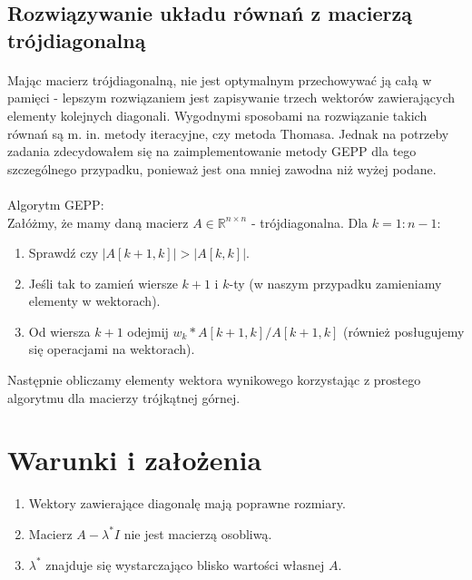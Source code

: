 \documentclass{article}
\begin{document}
\subsection{Rozwiązywanie układu równań z macierzą trójdiagonalną}
\label{tridiagonal}
\paragraph{}
Mając macierz trójdiagonalną, nie jest optymalnym przechowywać ją całą w pamięci - lepszym rozwiązaniem jest zapisywanie trzech wektorów zawierających elementy kolejnych diagonali. Wygodnymi sposobami na rozwiązanie takich równań są m. in. metody iteracyjne, czy metoda Thomasa. Jednak na potrzeby zadania zdecydowałem się na zaimplementowanie metody GEPP dla tego szczególnego przypadku, ponieważ jest ona mniej zawodna niż wyżej podane.
\paragraph{}
Algorytm GEPP:\\
Załóżmy, że mamy daną macierz $A\in\mathbb{R}^{n\times n}$ - trójdiagonalna. Dla $k=1:n-1$:
\begin{enumerate}
\item Sprawdź czy $|A[k+1,k]| > |A[k,k]|$.
\item Jeśli tak to zamień wiersze $k+1$ i $k$-ty (w naszym przypadku zamieniamy elementy w wektorach).
\item Od wiersza $k+1$ odejmij $w_{k}*A[k+1,k]/A[k+1,k]$ (również posługujemy się operacjami na wektorach).
\end{enumerate}
Następnie obliczamy elementy wektora wynikowego korzystając z prostego algorytmu dla macierzy trójkątnej górnej.
\section{Warunki i założenia}
\begin{enumerate}
\item Wektory zawierające diagonalę mają poprawne rozmiary.
\item Macierz $A - \lambda^*I$ nie jest macierzą osobliwą.
\item $\lambda^*$ znajduje się wystarczająco blisko wartości własnej $A$. 
\end{enumerate}
\end{document}
